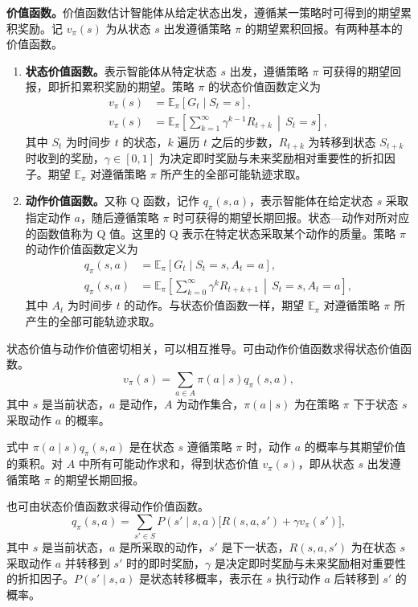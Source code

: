 \textbf{价值函数。}价值函数估计智能体从给定状态出发，遵循某一策略时可得到的期望累积奖励。记 $v_\pi(s)$ 为从状态 $s$ 出发遵循策略 $\pi$ 的期望累积回报。有两种基本的价值函数。
\begin{enumerate}
\item \textbf{状态价值函数。}表示智能体从特定状态 $s$ 出发，遵循策略 $\pi$ 可获得的期望回报，即折扣累积奖励的期望。策略 $\pi$ 的状态价值函数定义为
\begin{align}
v_\pi(s)&=\mathbb{E}_\pi[G_t\mid S_t=s],
\label{eq:appb-state-value}\\
v_\pi(s)&=\mathbb{E}_\pi\left[
\sum_{k=1}^{\infty}\gamma^{k-1}R_{t+k}\,\middle|\, S_t=s
\right],
\label{eq:appb-state-value-expanded}
\end{align}
其中 $S_t$ 为时间步 $t$ 的状态，$k$ 遍历 $t$ 之后的步数，$R_{t+k}$ 为转移到状态 $S_{t+k}$ 时收到的奖励，$\gamma\in[0,1]$ 为决定即时奖励与未来奖励相对重要性的折扣因子。期望 $\mathbb{E}_\pi$ 对遵循策略 $\pi$ 所产生的全部可能轨迹求取。

\item \textbf{动作价值函数。}又称 Q 函数，记作 $q_\pi(s,a)$，表示智能体在给定状态 $s$ 采取指定动作 $a$，随后遵循策略 $\pi$ 时可获得的期望长期回报。状态—动作对所对应的函数值称为 Q 值。这里的 Q 表示在特定状态采取某个动作的质量。策略 $\pi$ 的动作价值函数定义为
\begin{align}
q_\pi(s,a)&=\mathbb{E}_\pi[G_t\mid S_t=s,A_t=a],
\label{eq:appb-action-value}\\
q_\pi(s,a)&=\mathbb{E}_\pi\left[
\sum_{k=0}^{\infty}\gamma^kR_{t+k+1}\,\middle|\, S_t=s,A_t=a
\right],
\label{eq:appb-action-value-expanded}
\end{align}
其中 $A_t$ 为时间步 $t$ 的动作。与状态价值函数一样，期望 $\mathbb{E}_\pi$ 对遵循策略 $\pi$ 所产生的全部可能轨迹求取。
\end{enumerate}

状态价值与动作价值密切相关，可以相互推导。可由动作价值函数求得状态价值函数。
\begin{equation}
v_\pi(s)=\sum_{a\in A}\pi(a\mid s)q_\pi(s,a),
\label{eq:appb-state-from-action}
\end{equation}
其中 $s$ 是当前状态，$a$ 是动作，$A$ 为动作集合，$\pi(a\mid s)$ 为在策略 $\pi$ 下于状态 $s$ 采取动作 $a$ 的概率。

式中 $\pi(a\mid s)q_\pi(s,a)$ 是在状态 $s$ 遵循策略 $\pi$ 时，动作 $a$ 的概率与其期望价值的乘积。对 $A$ 中所有可能动作求和，得到状态价值 $v_\pi(s)$，即从状态 $s$ 出发遵循策略 $\pi$ 的期望长期回报。

也可由状态价值函数求得动作价值函数。
\begin{equation}
q_\pi(s,a)=\sum_{s'\in S}P(s'\mid s,a)\bigl[R(s,a,s')+\gamma v_\pi(s')\bigr],
\label{eq:appb-action-from-state}
\end{equation}
其中 $s$ 是当前状态，$a$ 是所采取的动作，$s'$ 是下一状态，$R(s,a,s')$ 为在状态 $s$ 采取动作 $a$ 并转移到 $s'$ 时的即时奖励，$\gamma$ 是决定即时奖励与未来奖励相对重要性的折扣因子。$P(s'\mid s,a)$ 是状态转移概率，表示在 $s$ 执行动作 $a$ 后转移到 $s'$ 的概率。

